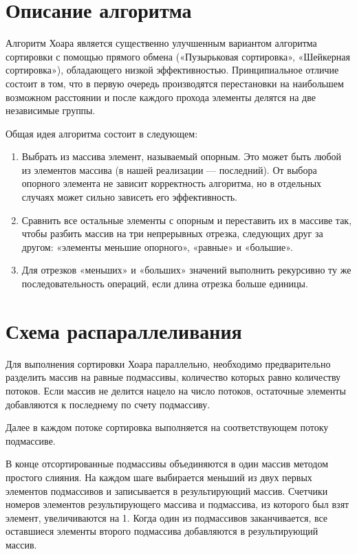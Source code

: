 \documentclass{report}
\begin{document}
\section*{Описание алгоритма}
Алгоритм Хоара является существенно улучшенным вариантом алгоритма сортировки с помощью прямого обмена («Пузырьковая сортировка», «Шейкерная сортировка»), обладающего низкой эффективностью. Принципиальное отличие состоит в том, что в первую очередь производятся перестановки на наибольшем возможном расстоянии и после каждого прохода элементы делятся на две независимые группы.
\par Общая идея алгоритма состоит в следующем:
\begin{enumerate}
\item Выбрать из массива элемент, называемый опорным. Это может быть любой из элементов массива (в нашей реализации --- последний). От выбора опорного элемента не зависит корректность алгоритма, но в отдельных случаях может сильно зависеть его эффективность.
\item Сравнить все остальные элементы с опорным и переставить их в массиве так, чтобы разбить массив на три непрерывных отрезка, следующих друг за другом: «элементы меньшие опорного», «равные» и «большие».
\item Для отрезков «меньших» и «больших» значений выполнить рекурсивно ту же последовательность операций, если длина отрезка больше единицы.
\end{enumerate}

\newpage

\section*{Схема распараллеливания}
Для выполнения сортировки Хоара параллельно, необходимо предварительно разделить массив на равные подмассивы, количество которых равно количеству потоков. Если массив не делится нацело на число потоков, остаточные элементы добавляются к последнему по счету подмассиву.
\par Далее в каждом потоке сортировка выполняется на соответствующем потоку подмассиве.
\par В конце отсортированные подмассивы объединяются в один массив методом простого слияния. На каждом шаге выбирается меньший из двух первых элементов подмассивов и записывается в результирующий массив. Счетчики номеров элементов результирующего массива и подмассива, из которого был взят элемент, увеличиваются на 1. Когда один из подмассивов заканчивается, все оставшиеся элементы второго подмассива добавляются в результирующий массив.
\newpage
\end{document}
